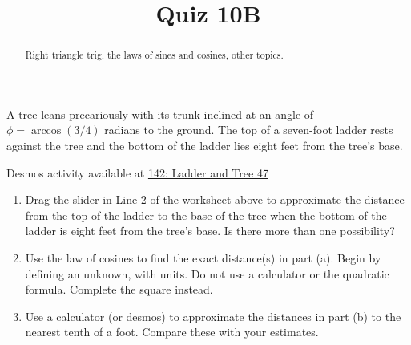 \documentclass{ximera}
\title{Quiz 10B}
\begin{document}
\begin{abstract}
Right triangle trig, the laws of sines and cosines, other topics.
\end{abstract}
\maketitle


\begin{question} \label{QLMVVEVEeddf}
A tree leans precariously with its trunk inclined at an angle of $\phi=\arccos(3/4)$ radians to the ground. The top of a seven-foot ladder rests against the tree and the bottom of the ladder lies eight feet from the tree's base. %

\begin{onlineOnly}
    \begin{center}
\end{center}
\end{onlineOnly}

Desmos activity available at \href{https://www.desmos.com/calculator/8bbcfyrita}{142: Ladder and Tree 47}

\begin{enumerate}
\item Drag the slider in Line 2 of the worksheet above to approximate the distance from the top of the ladder to the base of the tree when the bottom of the ladder is eight feet from the tree's base. Is there more than one possibility?

\item Use the law of cosines to find the exact distance(s) in part (a). Begin by defining an unknown, with units. Do not use a calculator or the quadratic formula. Complete the square instead.

\item Use a calculator (or desmos) to approximate the distances in part (b) to the nearest tenth of a foot. Compare these with your estimates.
\end{enumerate}


\end{question}
\end{document}
